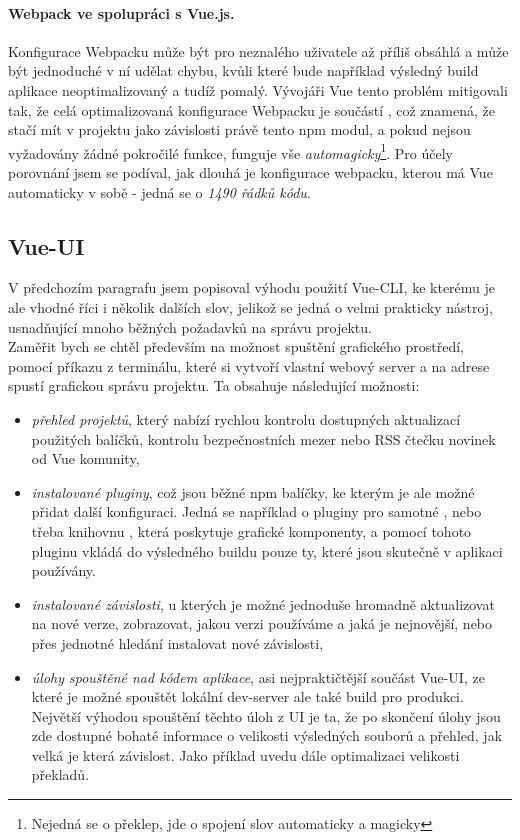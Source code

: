 \paragraph{Webpack ve spolupráci s Vue.js.} Konfigurace Webpacku může být pro neznalého uživatele až příliš obsáhlá a může být jednoduché v ní udělat chybu, kvůli které bude například výsledný build aplikace neoptimalizovaný a tudíž pomalý. Vývojáři Vue tento problém mitigovali tak, že celá optimalizovaná konfigurace Webpacku je součástí , což znamená, že stačí mít v projektu jako závislosti právě tento npm modul, a pokud nejsou vyžadovány žádné pokročilé funkce, funguje vše \emph{automagicky}\footnote{Nejedná se o překlep, jde o spojení slov automaticky a magicky}. Pro účely porovnání jsem se podíval, jak dlouhá je konfigurace webpacku, kterou má Vue automaticky v sobě - jedná se o \emph{1490 řádků kódu}.


\subsection{Vue-UI}

V předchozím paragrafu jsem popisoval výhodu použití Vue-CLI, ke kterému je ale vhodné říci i několik dalších slov, jelikož se jedná o velmi prakticky nástroj, usnadňující mnoho běžných požadavků na správu projektu.\\
Zaměřit bych se chtěl především na možnost spuštění grafického prostředí, pomocí příkazu  z terminálu, které si vytvoří vlastní webový server a na adrese  spustí grafickou správu projektu. Ta obsahuje následující možnosti:
\begin{itemize}
    \item \emph{přehled projektů}, který nabízí rychlou kontrolu dostupných aktualizací použitých balíčků, kontrolu bezpečnostních mezer nebo RSS čtečku novinek od Vue komunity,
    \item \emph{instalované pluginy}, což jsou běžné npm balíčky, ke kterým je ale možné přidat další konfiguraci. Jedná se například o pluginy pro samotné ,  nebo třeba knihovnu , která poskytuje grafické komponenty, a pomocí tohoto pluginu vkládá do výsledného buildu pouze ty, které jsou skutečně v aplikaci používány.
    \item \emph{instalované závislosti}, u kterých je možné jednoduše hromadně aktualizovat na nové verze, zobrazovat, jakou verzi používáme a jaká je nejnovější, nebo přes jednotné hledání instalovat nové závislosti,
    \item \emph{úlohy spouštěné nad kódem aplikace}, asi nejpraktičtější součást Vue-UI, ze které je možné spouštět lokální dev-server ale také build pro produkci. Největší výhodou spouštění těchto úloh z UI je ta, že po skončení úlohy jsou zde dostupné bohaté informace o velikosti výsledných souborů a přehled, jak velká je která závislost. Jako příklad uvedu dále optimalizaci velikosti překladů.
\end{itemize}


